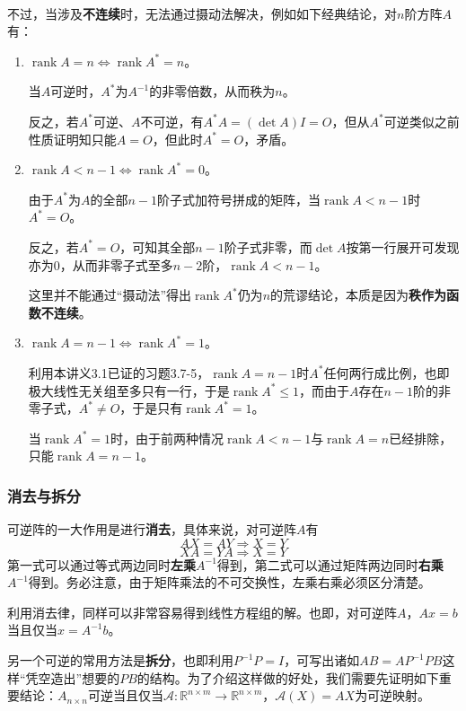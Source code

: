 \documentclass[a4paper,UTF8,fontset=windows]{ctexart}
\DeclareMathOperator{\rank}{rank}
\newcommand*{\note}{\noindent *}
\begin{document}
\

不过，当涉及\textbf{不连续}时，无法通过摄动法解决，例如如下经典结论，对$n$阶方阵$A$有：
\begin{enumerate}
    \item $\rank A=n\Longleftrightarrow\rank A^*=n$。
    
    当$A$可逆时，$A^*$为$A^{-1}$的非零倍数，从而秩为$n$。
    
    反之，若$A^*$可逆、$A$不可逆，有$A^*A=(\det A)I=O$，但从$A^*$可逆类似之前性质证明知只能$A=O$，但此时$A^*=O$，矛盾。

    \item $\rank A<n-1\Longleftrightarrow\rank A^*=0$。
    
    由于$A^*$为$A$的全部$n-1$阶子式加符号拼成的矩阵，当$\rank A<n-1$时$A^*=O$。

    反之，若$A^*=O$，可知其全部$n-1$阶子式非零，而$\det A$按第一行展开可发现亦为0，从而非零子式至多$n-2$阶，$\rank A<n-1$。

    \note 这里并不能通过``摄动法''得出$\rank A^*$仍为$n$的荒谬结论，本质是因为\textbf{秩作为函数不连续}。

    \item $\rank A=n-1\Longleftrightarrow\rank A^*=1$。
    
    利用本讲义3.1已证的习题3.7-5，$\rank A=n-1$时$A^*$任何两行成比例，也即极大线性无关组至多只有一行，于是$\rank A^*\le1$，而由于$A$存在$n-1$阶的非零子式，$A^*\ne O$，于是只有$\rank A^*=1$。

    当$\rank A^*=1$时，由于前两种情况$\rank A<n-1$与$\rank A=n$已经排除，只能$\rank A=n-1$。
\end{enumerate}

\subsubsection{消去与拆分}
可逆阵的一大作用是进行\textbf{消去}，具体来说，对可逆阵$A$有
$$AX=AY\Longrightarrow X=Y$$
$$XA=YA\Longrightarrow X=Y$$
第一式可以通过等式两边同时\textbf{左乘}$A^{-1}$得到，第二式可以通过矩阵两边同时\textbf{右乘}$A^{-1}$得到。务必注意，由于矩阵乘法的不可交换性，左乘右乘必须区分清楚。

利用消去律，同样可以非常容易得到线性方程组的解。也即，对可逆阵$A$，$Ax=b$当且仅当$x=A^{-1}b$。

另一个可逆的常用方法是\textbf{拆分}，也即利用$P^{-1}P=I$，可写出诸如$AB=AP^{-1}PB$这样``凭空造出''想要的$PB$的结构。为了介绍这样做的好处，我们需要先证明如下重要结论：$A_{n\times n}$可逆当且仅当$\mathcal{A}:\mathbb{R}^{n\times m}\to\mathbb{R}^{n\times m}$，$\mathcal{A}(X)=AX$为可逆映射。
\end{document}
